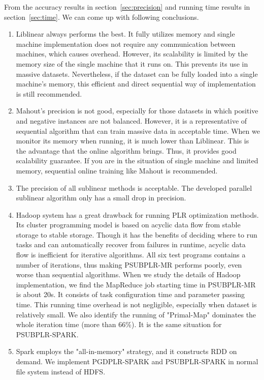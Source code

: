 \documentclass{llncs}
\begin{document}
From the accuracy results in section~\ref{sec:precision} and running time results in section~\ref{sec:time}.
We can come up with following conclusions.
\begin{enumerate}
    \item Liblinear always performs the best. It fully utilizes memory and single machine implementation does not require any communication between machines, which causes overhead.
          However, its scalability is limited by the memory size of the single machine that it runs on. This prevents its use in massive datasets.
          Nevertheless, if the dataset can be fully loaded into a single machine's memory, this efficient and direct sequential way of implementation is still recommended. 
    \item Mahout's precision is not good, especially for those datasets in which positive and negative instances are not balanced.
          However, it is a representative of sequential algorithm that can train massive data in acceptable time.
          When we monitor its memory when running, it is much lower than Liblinear. This is the advantage that the online algorithm brings.
          Thus, it provides good scalability guarantee. If you are in the situation of single machine and limited memory, sequential online training like Mahout is recommended. 
    \item The precision of all sublinear methods is acceptable. The developed parallel sublinear algorithm only has a small drop in precision.
    \item Hadoop system has a great drawback for running PLR optimization methods. Its cluster programming model is based on acyclic data flow from stable storage to stable storage.
          Though it has the benefits of deciding where to run tasks and can automatically recover from failures in runtime, acyclic data flow is inefficient for iterative algorithms.
          All six test programs contains a number of iterations, thus making PSUBPLR-MR performs poorly, even worse than sequential algorithms.
          When we study the details of Hadoop implementation, we find the MapReduce job starting time in PSUBPLR-MR is about 20s. It consists of task configuration time and parameter passing time.
          This running time overhead is not negligible, especially when dataset is relatively small.
          We also identify the running of "Primal-Map" dominates the whole iteration time (more than 66\%). It is the same situation for PSUBPLR-SPARK.
    \item Spark employs the "all-in-memory" strategy, and it constructs RDD on demand. We implement PGDPLR-SPARK and PSUBPLR-SPARK in normal file system instead of HDFS.

\end{enumerate}
\end{document}
